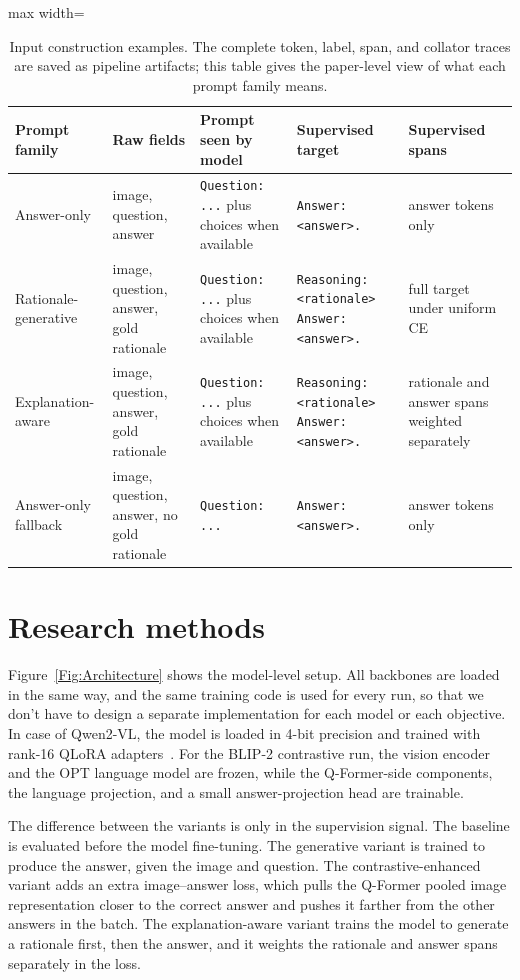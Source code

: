 \documentclass[12pt,bibliography=totoc,listof=totoc,BCOR=5mm,DIV=12,oneside,open=any]{scrbook}
\let\cite\citep
\begin{document}
\begin{table}[!ht]
\centering
\caption{Input construction examples. The complete token, label, span, and collator traces are saved as pipeline artifacts; this table gives the paper-level view of what each prompt family means.}
\label{tab:InputConstruction}
\scriptsize
\begin{adjustbox}{max width=\textwidth}
\begin{tabular}{|p{2.5cm}|p{3.6cm}|p{4.5cm}|p{4.5cm}|p{2.8cm}|}
\hline
\textbf{Prompt family} & \textbf{Raw fields} & \textbf{Prompt seen by model} & \textbf{Supervised target} & \textbf{Supervised spans} \\ \hline
Answer-only & image, question, answer & \texttt{Question: ...} plus choices when available & \texttt{Answer: <answer>.} & answer tokens only \\
Rationale-generative & image, question, answer, gold rationale & \texttt{Question: ...} plus choices when available & \texttt{Reasoning: <rationale> Answer: <answer>.} & full target under uniform CE \\
Explanation-aware & image, question, answer, gold rationale & \texttt{Question: ...} plus choices when available & \texttt{Reasoning: <rationale> Answer: <answer>.} & rationale and answer spans weighted separately \\
Answer-only fallback & image, question, answer, no gold rationale & \texttt{Question: ...} & \texttt{Answer: <answer>.} & answer tokens only \\ \hline
\end{tabular}
\end{adjustbox}
\end{table}

\section{Research methods}
Figure~\ref{Fig:Architecture} shows the model-level setup.
All backbones are loaded in the same way, and the same training code is used for every run,
so that we don't have to design a separate implementation for each model or each objective.
In case of Qwen2-VL, the model is loaded in 4-bit precision and trained with rank-16 QLoRA adapters~\cite{hu2022lora,dettmers2023qlora}.
For the BLIP-2 contrastive run, the vision encoder and the OPT language model are frozen,
while the Q-Former-side components, the language projection, and a small answer-projection head are trainable.

The difference between the variants is only in the supervision signal.
The baseline is evaluated before the model fine-tuning.
The generative variant is trained to produce the answer, given the image and question.
The contrastive-enhanced variant adds an extra image--answer loss, which pulls the Q-Former pooled image representation
closer to the correct answer and pushes it farther from the other answers in the batch.
The explanation-aware variant trains the model to generate a rationale first, then the answer, and it weights the rationale and answer spans separately in the loss.
\end{document}
